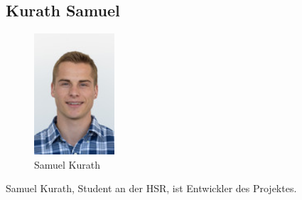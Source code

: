 \subsection{Kurath Samuel}
\begin{figure}[H]
	\centering
	\includegraphics[width=30mm]{images/skurath.jpg}
	\caption{Samuel Kurath}
\end{figure}
Samuel Kurath, Student an der HSR, ist Entwickler des Projektes.
